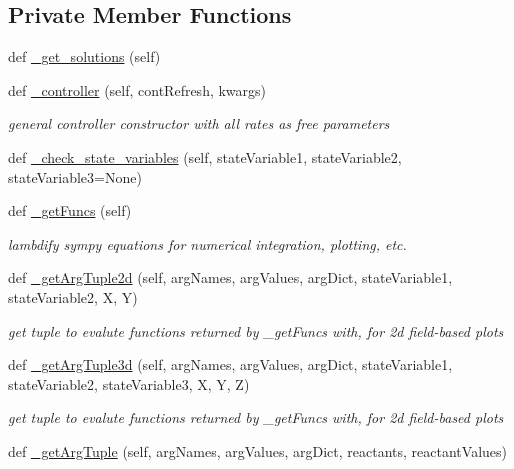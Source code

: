 \subsection*{Private Member Functions}
\begin{DoxyCompactItemize}
\item 
def \hyperlink{class_mu_mo_t_1_1_mu_mo_tmodel_ac8f6319b8c81e7c48d1f892603bcd307}{\+\_\+get\+\_\+solutions} (self)
\item 
def \hyperlink{class_mu_mo_t_1_1_mu_mo_tmodel_a858789fcc57b8480f22e2a6f4446d94e}{\+\_\+controller} (self, cont\+Refresh, kwargs)
\begin{DoxyCompactList}\small\item\em general controller constructor with all rates as free parameters \end{DoxyCompactList}\item 
def \hyperlink{class_mu_mo_t_1_1_mu_mo_tmodel_abef2b7019d8de30c16d7ade84ad45e09}{\+\_\+check\+\_\+state\+\_\+variables} (self, state\+Variable1, state\+Variable2, state\+Variable3=None)
\item 
def \hyperlink{class_mu_mo_t_1_1_mu_mo_tmodel_aa69fe5568e12577be5a63232d689e45e}{\+\_\+get\+Funcs} (self)
\begin{DoxyCompactList}\small\item\em lambdify sympy equations for numerical integration, plotting, etc. \end{DoxyCompactList}\item 
def \hyperlink{class_mu_mo_t_1_1_mu_mo_tmodel_a0965e5e61aa8f0d4e399e3b534d31a4c}{\+\_\+get\+Arg\+Tuple2d} (self, arg\+Names, arg\+Values, arg\+Dict, state\+Variable1, state\+Variable2, X, Y)
\begin{DoxyCompactList}\small\item\em get tuple to evalute functions returned by \+\_\+get\+Funcs with, for 2d field-\/based plots \end{DoxyCompactList}\item 
def \hyperlink{class_mu_mo_t_1_1_mu_mo_tmodel_a4a81885dd0451b6af31285c234b61d2a}{\+\_\+get\+Arg\+Tuple3d} (self, arg\+Names, arg\+Values, arg\+Dict, state\+Variable1, state\+Variable2, state\+Variable3, X, Y, Z)
\begin{DoxyCompactList}\small\item\em get tuple to evalute functions returned by \+\_\+get\+Funcs with, for 2d field-\/based plots \end{DoxyCompactList}\item 
def \hyperlink{class_mu_mo_t_1_1_mu_mo_tmodel_af547c59d7ec82de308ee85b118fc7295}{\+\_\+get\+Arg\+Tuple} (self, arg\+Names, arg\+Values, arg\+Dict, reactants, reactant\+Values)

\end{DoxyCompactItemize}
